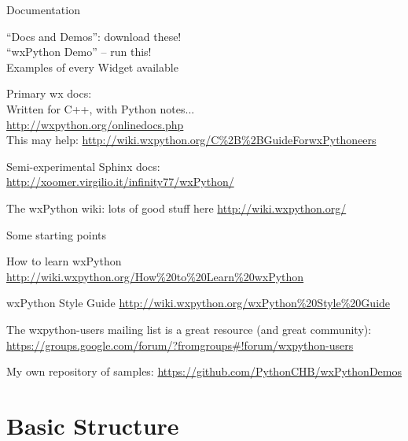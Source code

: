 \documentclass{beamer}
\begin{document}
\begin{frame}[fragile]{Documentation}

\vfill
{\Large ``Docs and Demos'': download these!}\\

\vfill
{\Large ``wxPython Demo'' -- run this!}\\
{\large Examples of every Widget available}

\vfill
{\Large Primary wx docs:}\\
{\large Written for C++, with Python notes...}\\
\url{http://wxpython.org/onlinedocs.php}\\
This may help: \url{http://wiki.wxpython.org/C%2B%2BGuideForwxPythoneers}

\vfill
{\large Semi-experimental Sphinx docs:}\\
\url{http://xoomer.virgilio.it/infinity77/wxPython/}

\vfill
{\Large The wxPython wiki: lots of good stuff here}
\url{http://wiki.wxpython.org/}

\end{frame}

\begin{frame}[fragile]{Some starting points}


\vfill
{\Large How to learn wxPython}
\url{http://wiki.wxpython.org/How%20to%20Learn%20wxPython}

\vfill
{\Large wxPython Style Guide}
\url{http://wiki.wxpython.org/wxPython%20Style%20Guide}

\vfill
{\Large The wxpython-users mailing list is a great resource (and great community):}\\
\url{https://groups.google.com/forum/?fromgroups#!forum/wxpython-users}

\vfill
{\large My own repository of samples:}
\url{https://github.com/PythonCHB/wxPythonDemos}

\end{frame}


\section{Basic Structure}
\end{document}
